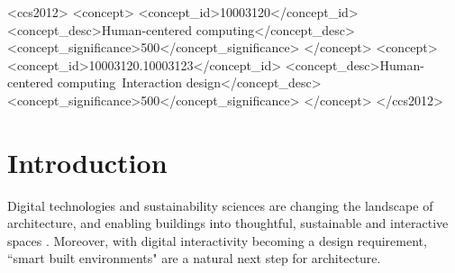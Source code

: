 \documentclass[manuscript, anonymous, review]{acmart}
\begin{document}

\begin{CCSXML}
<ccs2012>
   <concept>
       <concept_id>10003120</concept_id>
       <concept_desc>Human-centered computing</concept_desc>
       <concept_significance>500</concept_significance>
       </concept>
   <concept>
       <concept_id>10003120.10003123</concept_id>
       <concept_desc>Human-centered computing~Interaction design</concept_desc>
       <concept_significance>500</concept_significance>
       </concept>
 </ccs2012>
\end{CCSXML}




 
\maketitle

\section{Introduction}
Digital technologies and sustainability sciences are changing the landscape of architecture, and enabling buildings into thoughtful, sustainable and interactive spaces  \cite{kolarevic2004architecture}. Moreover, with digital interactivity becoming a design requirement, ``smart built environments" are a natural next step for architecture. 
\end{document}

